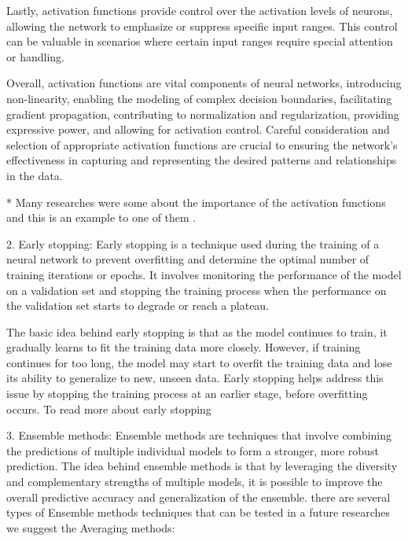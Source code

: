 \documentclass[a4paper]{article}
\begin{document}
Lastly, activation functions provide control over the activation levels of neurons, allowing the network to emphasize or suppress specific input ranges. This control can be valuable in scenarios where certain input ranges require special attention or handling.

Overall, activation functions are vital components of neural networks, introducing non-linearity, enabling the modeling of complex decision boundaries, facilitating gradient propagation, contributing to normalization and regularization, providing expressive power, and allowing for activation control. Careful consideration and selection of appropriate activation functions are crucial to ensuring the network's effectiveness in capturing and representing the desired patterns and relationships in the data.\newline

* Many researches were some about the importance of the activation functions and this is an example to one of them \cite{sharma2017activation}.\newline

2. Early stopping: Early stopping is a technique used during the training of a neural network to prevent overfitting and determine the optimal number of training iterations or epochs. It involves monitoring the performance of the model on a validation set and stopping the training process when the performance on the validation set starts to degrade or reach a plateau.

The basic idea behind early stopping is that as the model continues to train, it gradually learns to fit the training data more closely. However, if training continues for too long, the model may start to overfit the training data and lose its ability to generalize to new, unseen data. Early stopping helps address this issue by stopping the training process at an earlier stage, before overfitting occurs. To read more about early stopping \cite{prechelt2002early}

3. Ensemble methods: Ensemble methods are techniques that involve combining the predictions of multiple individual models to form a stronger, more robust prediction. The idea behind ensemble methods is that by leveraging the diversity and complementary strengths of multiple models, it is possible to improve the overall predictive accuracy and generalization of the ensemble. there are several types of Ensemble methods techniques that can be tested in a future researches we suggest the Averaging methods:
\end{document}
